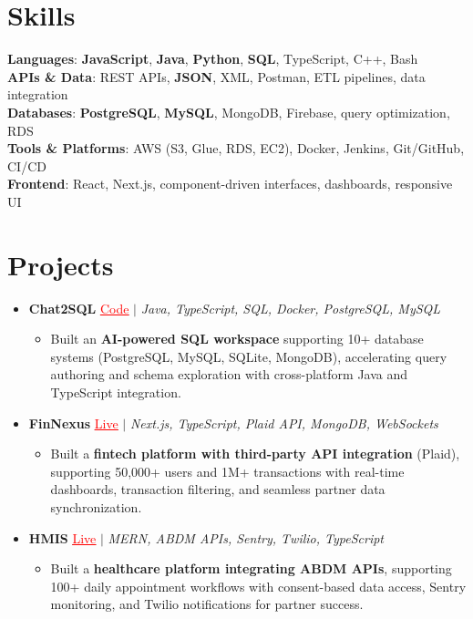 \documentclass[letterpaper,10pt]{article}
\newcommand{\resumeItem}[1]{\item\small{{#1 \vspace{-2pt}}}}
\newcommand{\resumeProjectHeading}[1]{\item \small #1 \vspace{-2pt}}
\newcommand{\resumeSubHeadingListStart}{\begin{itemize}[leftmargin=0.0in, label={}]}
\newcommand{\resumeSubHeadingListEnd}{\end{itemize}}
\newcommand{\resumeProjItemListStart}{\begin{itemize}[leftmargin=0.15in,label=\textbullet,itemsep=0pt,topsep=0pt,parsep=0pt,partopsep=0pt]}
\newcommand{\resumeProjItemListEnd}{\end{itemize}\vspace{-4pt}}
\begin{document}
\section{Skills}
\begin{itemize}[leftmargin=0.15in, label={}]
\small{\item{
\textbf{Languages}: \textbf{JavaScript}, \textbf{Java}, \textbf{Python}, \textbf{SQL}, TypeScript, C++, Bash \\
\textbf{APIs \& Data}: REST APIs, \textbf{JSON}, XML, Postman, ETL pipelines, data integration \\
\textbf{Databases}: \textbf{PostgreSQL}, \textbf{MySQL}, MongoDB, Firebase, query optimization, RDS \\
\textbf{Tools \& Platforms}: AWS (S3, Glue, RDS, EC2), Docker, Jenkins, Git/GitHub, CI/CD \\
\textbf{Frontend}: React, Next.js, component-driven interfaces, dashboards, responsive UI
}}
\end{itemize}
\vspace{-16pt}
\section{Projects}
\resumeSubHeadingListStart
\vspace{-2pt}
\resumeProjectHeading{\textbf{Chat2SQL} {\href{https://github.com/SAHAJ-BHADJA/Chat2SQL}{\textcolor{red}{\underline{Code}}}} $|$ \emph{Java, TypeScript, SQL, Docker, PostgreSQL, MySQL}}
\resumeProjItemListStart
\resumeItem{Built an \textbf{AI-powered SQL workspace} supporting 10+ database systems (PostgreSQL, MySQL, SQLite, MongoDB), accelerating query authoring and schema exploration with cross-platform Java and TypeScript integration.}
\resumeProjItemListEnd
\vspace{3pt}
\resumeProjectHeading{\textbf{FinNexus} {\href{https://fin-nexus.vercel.app/}{\textcolor{red}{\underline{Live}}}} $|$ \emph{Next.js, TypeScript, Plaid API, MongoDB, WebSockets}}
\resumeProjItemListStart
\resumeItem{Built a \textbf{fintech platform with third-party API integration} (Plaid), supporting 50,000+ users and 1M+ transactions with real-time dashboards, transaction filtering, and seamless partner data synchronization.}
\resumeProjItemListEnd
\vspace{3pt}
\resumeProjectHeading{\textbf{HMIS} {\href{https://hims-rouge.vercel.app/}{\textcolor{red}{\underline{Live}}}} $|$ \emph{MERN, ABDM APIs, Sentry, Twilio, TypeScript}}
\resumeProjItemListStart
\resumeItem{Built a \textbf{healthcare platform integrating ABDM APIs}, supporting 100+ daily appointment workflows with consent-based data access, Sentry monitoring, and Twilio notifications for partner success.}
\resumeProjItemListEnd
\resumeSubHeadingListEnd
\end{document}
